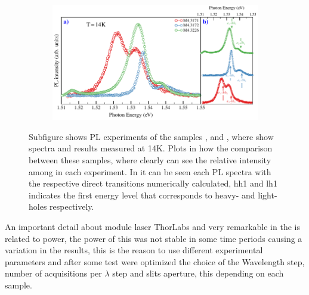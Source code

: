 \begin{figure}[hbt!]
	\centering
	\begin{subfigure}{\textwidth}
		\includegraphics[width=\textwidth]{../figures/chapter-3/pl-plots/build/pl-1}
		\label{subfig:chapter-3-PL-experiments-M4_3171-M4_3172-M4_3226-a)}
		\label{subfig:chapter-3-PL-experiments-M4_3171-M4_3172-M4_3226-b)}
	\end{subfigure}
	\caption{ Subfigure  shows PL experiments of the samples ,  and , where show spectra and results measured at 14K. Plots in how the comparison between these samples, where clearly can see the relative intensity among in each experiment. In  it can be seen each PL spectra with the  respective direct transitions numerically calculated, hh1 and lh1 indicates  the first energy level that corresponds to heavy- and light-holes respectively.\label{fig:chapter-3-PL-experiments-M4_3171-M4_3172-M4_3226}}
\end{figure}



An important detail about module laser ThorLabs and very remarkable in the  is related to power, the power of this was not stable in some time periods causing a variation in the results, this is the reason to use different experimental parameters  and after some test were optimized the choice  of the Wavelength step, number of acquisitions per $\lambda$ step and slits aperture, this depending on each sample. 

